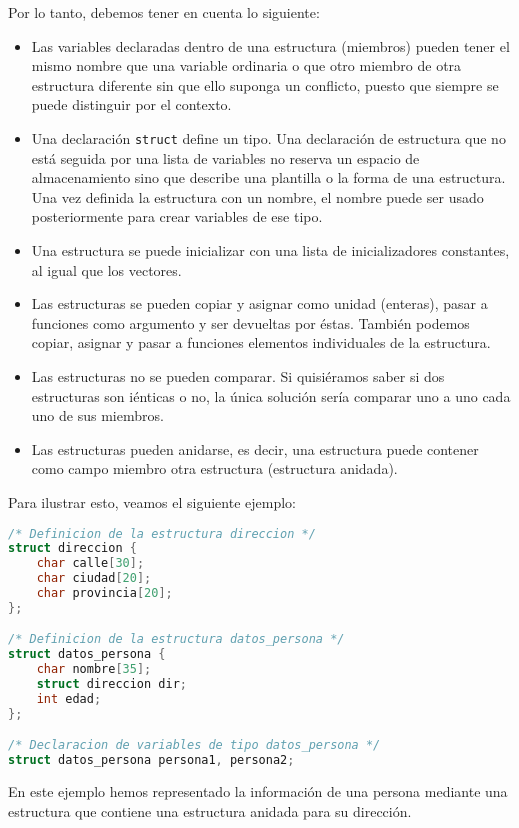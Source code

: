 Por lo tanto, debemos tener en cuenta lo siguiente:
\begin{itemize}
	\item Las variables declaradas dentro de una estructura (miembros) pueden tener el mismo nombre que una variable ordinaria o que otro miembro de otra estructura diferente sin que ello suponga un conflicto, puesto que siempre se puede distinguir por el contexto.
	\item Una declaración \texttt{struct} define un tipo. Una declaración de estructura que no está seguida por una lista de variables no reserva un espacio de almacenamiento sino que describe una plantilla o la forma de una estructura. Una vez definida la estructura con un nombre, el nombre puede ser usado posteriormente para crear variables de ese tipo.
	\item Una estructura se puede inicializar con una lista de inicializadores constantes, al igual que los vectores.
	\item Las estructuras se pueden copiar y asignar como unidad (enteras), pasar a funciones como argumento y ser devueltas por éstas. También podemos copiar, asignar y pasar a funciones elementos individuales de la estructura.
	\item Las estructuras no se pueden comparar. Si quisiéramos saber si dos estructuras son iénticas o no, la única solución sería comparar uno a uno cada uno de sus miembros.
	\item Las estructuras pueden anidarse, es decir, una estructura puede contener como campo miembro otra estructura (estructura anidada).
\end{itemize}
Para ilustrar esto, veamos el siguiente ejemplo:
\begin{Ejemplo}
\begin{lstlisting}[language=C]
/* Definicion de la estructura direccion */
struct direccion {
    char calle[30];
    char ciudad[20];
    char provincia[20];
};

/* Definicion de la estructura datos_persona */
struct datos_persona {
    char nombre[35];
    struct direccion dir;
    int edad;
};

/* Declaracion de variables de tipo datos_persona */
struct datos_persona persona1, persona2;
\end{lstlisting}
\Explicacion
En este ejemplo hemos representado la información de una persona mediante una estructura que contiene una estructura anidada para su dirección.\\
\end{Ejemplo}


